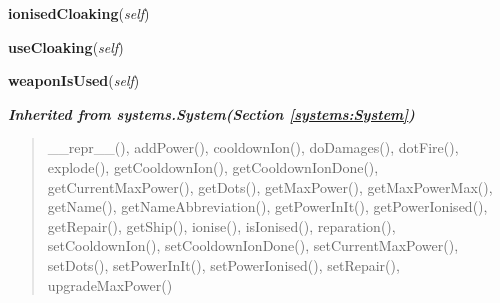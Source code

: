     \label{systems:Cloaking:ionisedCloaking}

    \vspace{0.5ex}

\hspace{.8\funcindent}\begin{boxedminipage}{\funcwidth}

    \raggedright \textbf{ionisedCloaking}(\textit{self})

\setlength{\parskip}{2ex}
\setlength{\parskip}{1ex}
    \end{boxedminipage}

    \label{systems:Cloaking:useCloaking}

    \vspace{0.5ex}

\hspace{.8\funcindent}\begin{boxedminipage}{\funcwidth}

    \raggedright \textbf{useCloaking}(\textit{self})

\setlength{\parskip}{2ex}
\setlength{\parskip}{1ex}
    \end{boxedminipage}

    \label{systems:Cloaking:weaponIsUsed}

    \vspace{0.5ex}

\hspace{.8\funcindent}\begin{boxedminipage}{\funcwidth}

    \raggedright \textbf{weaponIsUsed}(\textit{self})

\setlength{\parskip}{2ex}
\setlength{\parskip}{1ex}
    \end{boxedminipage}


\large{\textbf{\textit{Inherited from systems.System\textit{(Section \ref{systems:System})}}}}

\begin{quote}
\_\_repr\_\_(), addPower(), cooldownIon(), doDamages(), dotFire(), explode(), getCooldownIon(), getCooldownIonDone(), getCurrentMaxPower(), getDots(), getMaxPower(), getMaxPowerMax(), getName(), getNameAbbreviation(), getPowerInIt(), getPowerIonised(), getRepair(), getShip(), ionise(), isIonised(), reparation(), setCooldownIon(), setCooldownIonDone(), setCurrentMaxPower(), setDots(), setPowerInIt(), setPowerIonised(), setRepair(), upgradeMaxPower()
\end{quote}

